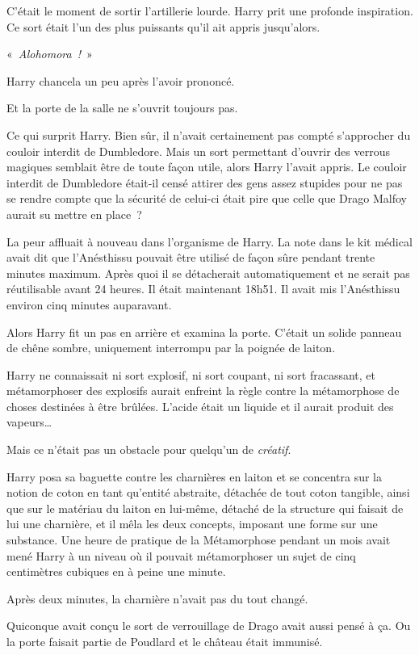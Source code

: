 C'était le moment de sortir l'artillerie lourde.
Harry prit une profonde inspiration.
Ce sort était l'un des plus puissants qu'il ait appris jusqu'alors.

«~\emph{Alohomora~!}~»

Harry chancela un peu après l'avoir prononcé.

Et la porte de la salle ne s'ouvrit toujours pas.

Ce qui surprit Harry.
Bien sûr, il n'avait certainement pas compté s'approcher du couloir interdit de Dumbledore.
Mais un sort permettant d'ouvrir des verrous magiques semblait être de toute façon utile, alors Harry l'avait appris.
Le couloir interdit de Dumbledore était-il censé attirer des gens assez stupides pour ne pas se rendre compte que la sécurité de celui-ci était pire que celle que Drago Malfoy aurait su mettre en place~?

La peur affluait à nouveau dans l'organisme de Harry.
La note dans le kit médical avait dit que l'Anésthissu pouvait être utilisé de façon sûre pendant trente minutes maximum.
Après quoi il se détacherait automatiquement et ne serait pas réutilisable avant 24 heures.
Il était maintenant 18h51.
Il avait mis l'Anésthissu environ cinq minutes auparavant.

Alors Harry fit un pas en arrière et examina la porte.
C'était un solide panneau de chêne sombre, uniquement interrompu par la poignée de laiton.

Harry ne connaissait ni sort explosif, ni sort coupant, ni sort fracassant, et métamorphoser des explosifs aurait enfreint la règle contre la métamorphose de choses destinées à être brûlées.
L'acide était un liquide et il aurait produit des vapeurs…

Mais ce n'était pas un obstacle pour quelqu'un de \emph{créatif}.

Harry posa sa baguette contre les charnières en laiton et se concentra sur la notion de coton en tant qu'entité abstraite, détachée de tout coton tangible, ainsi que sur le matériau du laiton en lui-même, détaché de la structure qui faisait de lui une charnière, et il mêla les deux concepts, imposant une forme sur une substance.
Une heure de pratique de la Métamorphose pendant un mois avait mené Harry à un niveau où il pouvait métamorphoser un sujet de cinq centimètres cubiques en à peine une minute.

Après deux minutes, la charnière n'avait pas du tout changé.

Quiconque avait conçu le sort de verrouillage de Drago avait aussi pensé à ça.
Ou la porte faisait partie de Poudlard et le château était immunisé.

